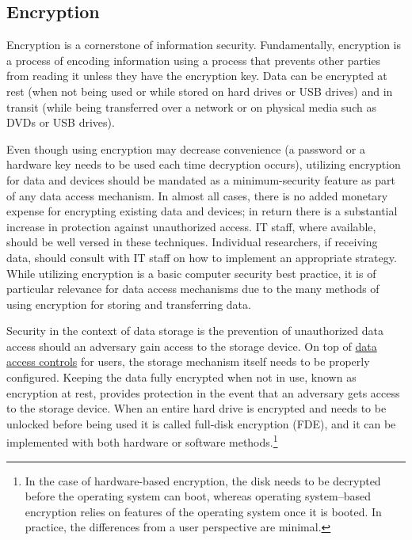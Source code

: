 \hypertarget{encryption}{%
\subsection{Encryption}\label{encryption}}

Encryption is a cornerstone of information security. Fundamentally, encryption is a process of encoding information using a process that prevents other parties from reading it unless they have the encryption key. Data can be encrypted at rest (when not being used or while stored on hard drives or USB drives) and in transit (while being transferred over a network or on physical media such as DVDs or USB drives).

Even though using encryption may decrease convenience (a password or a hardware key needs to be used each time decryption occurs), utilizing encryption for data and devices should be mandated as a minimum-security feature as part of any data access mechanism. In almost all cases, there is no added monetary expense for encrypting existing data and devices; in return there is a substantial increase in protection against unauthorized access. IT staff, where available, should be well versed in these techniques. Individual researchers, if receiving data, should consult with IT staff on how to implement an appropriate strategy. While utilizing encryption is a basic computer security best practice, it is of particular relevance for data access mechanisms due to the many methods of using encryption for storing and transferring data.

Security in the context of data storage is the prevention of unauthorized data access should an adversary gain access to the storage device. On top of \protect\hyperlink{data-access-controls}{data access controls} for users, the storage mechanism itself needs to be properly configured. Keeping the data fully encrypted when not in use, known as encryption at rest, provides protection in the event that an adversary gets access to the storage device. When an entire hard drive is encrypted and needs to be unlocked before being used it is called full-disk encryption (FDE), and it can be implemented with both hardware or software methods.\footnote{In the case of hardware-based encryption, the disk needs to be decrypted before the operating system can boot, whereas operating system--based encryption relies on features of the operating system once it is booted. In practice, the differences from a user perspective are minimal.}

